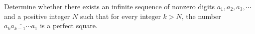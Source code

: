 Determine whether there exists an infinite sequence of nonzero digits 
$a_1 , a_2 , a_3 , \cdots $
 and a positive integer 
$N$
 such that for every integer 
$k > N$, 
 the number 
$\overline{a_k a_{k-1}\cdots a_1 }$
 is a perfect square.
